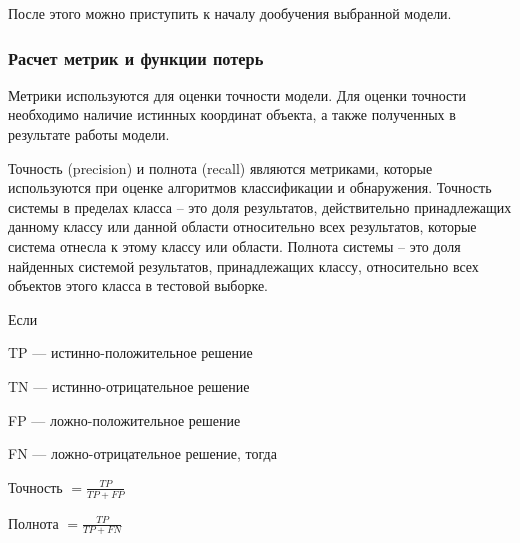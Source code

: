После этого можно приступить к началу дообучения выбранной модели.

\subsubsection{Расчет метрик и функции потерь}

Метрики используются для оценки точности модели. Для оценки точности необходимо наличие истинных координат объекта, а также полученных в результате работы модели. 

Точность (precision) и полнота (recall) являются метриками, которые используются при оценке алгоритмов классификации и обнаружения. Точность системы в пределах класса – это доля результатов, действительно принадлежащих данному классу или данной области относительно всех результатов, которые система отнесла к этому классу или области. Полнота системы – это доля найденных системой результатов, принадлежащих классу, относительно всех объектов этого класса в тестовой выборке.

Если 

%
\begin{itemize*}
  \item TP — истинно-положительное решение
  \item TN — истинно-отрицательное решение
  \item FP — ложно-положительное решение
  \item FN — ложно-отрицательное решение, тогда
\end{itemize*}
%
\begin{center}
Точность \(= \frac{TP}{TP+FP}\)
\end{center}

\begin{center}
Полнота \( = \frac{TP}{TP+FN}\)
\end{center}

